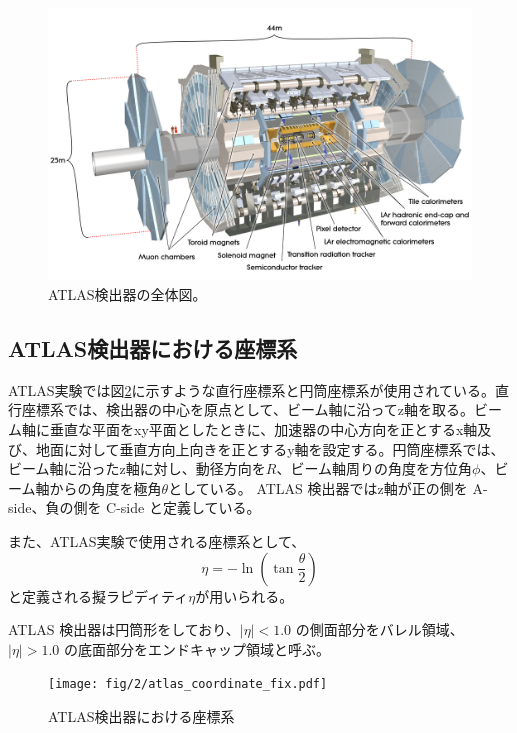 \begin{figure}[tb]
  \centering
  \includegraphics[clip,width=14cm]{fig/2/0803012_01.jpg}
  \caption{ATLAS検出器の全体図\cite{Aad:1129811}。}
  \label{fig:ATLAS検出器}
\end{figure}

\subsection{ATLAS検出器における座標系}
ATLAS実験では図\ref{fig:a}に示すような直行座標系と円筒座標系が使用されている。直行座標系では、検出器の中心を原点として、ビーム軸に沿ってz軸を取る。ビーム軸に垂直な平面をxy平面としたときに、加速器の中心方向を正とするx軸及び、地面に対して垂直方向上向きを正とするy軸を設定する。円筒座標系では、ビーム軸に沿ったz軸に対し、動径方向を$R$、ビーム軸周りの角度を方位角$\phi$、ビーム軸からの角度を極角$\theta$としている。
ATLAS 検出器ではz軸が正の側を A-side、負の側を C-side と定義している。

また、ATLAS実験で使用される座標系として、
\begin{equation}
　\eta=-\ln(\tan\frac{\theta}{2})
　\label{ラピディティ}
\end{equation}
と定義される擬ラピディティ$\eta$が用いられる。

ATLAS 検出器は円筒形をしており、$|\eta| < 1.0$ の側面部分をバレル領域、$|\eta| > 1.0$ の底面部分をエンドキャップ領域と呼ぶ。

\begin{figure}[tb]
  \centering
  \texttt{[image: fig/2/atlas\_coordinate\_fix.pdf]}
  \caption{ATLAS検出器における座標系}
  \label{fig:a}
\end{figure}

